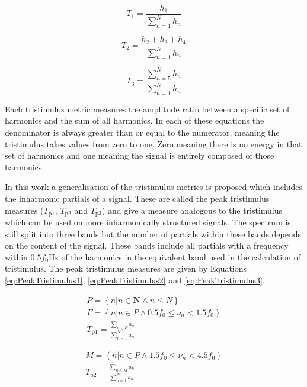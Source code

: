 			\begin{equation}
				T_{1} = \frac{h_{1}}{\sum_{n = 1}^{N} h_{n}}
				\label{eq:Tristimulus1}
			\end{equation}

			\begin{equation}
				T_{2} = \frac{h_{2} + h_{3} + h_{4}}{\sum_{n = 1}^{N} h_{n}}
				\label{eq:Tristimulus2}
			\end{equation}

			\begin{equation}
				T_{3} = \frac{\sum_{n = 5}^{N} h_{n}}{\sum_{n = 1}^{N} h_{n}}
				\label{eq:Tristimulus3}
			\end{equation}

			Each tristimulus metric measures the amplitude ratio between a specific set of harmonics and the
			sum of all harmonics. In each of these equations the denominator is always greater than or equal to
			the numerator, meaning the tristimulus takes values from zero to one. Zero meaning there is no
			energy in that set of harmonics and one meaning the signal is entirely composed of those harmonics.

			In this work a generalisation of the tristimulus metrics is proposed which includes the inharmonic
			partials of a signal. These are called the peak tristimulus measures ($T_{\mathrm{p}1}$,
			$T_{\mathrm{p}2}$ and $T_{\mathrm{p}3}$) and give a measure analogous to the tristimulus which can
			be used on more inharmonically structured signals. The spectrum is still split into three bands but
			the number of partials within these bands depends on the content of the signal. These bands include
			all partials with a frequency within $0.5f_{0}$Hz of the harmonics in the equivalent band used in
			the calculation of tristimulus.  The peak tristimulus measures are given by Equations
			\ref{eq:PeakTristimulus1}, \ref{eq:PeakTristimulus2} and \ref{eq:PeakTristimulus3}.

			\begin{gather}
				P = \left\{ n | n \in \textbf{N} \land n \leq N \right\} \nonumber \\[1em]
				F = \left\{ n | n \in P \land 0.5f_{0} \leq \nu_{n} < 1.5f_{0} \right\} \nonumber \\[0.6em]
				T_{\mathrm{p}1} = \frac{\sum_{n \in F} a_{n}}{\sum_{n = 1}^{N} a_{n}}
				\label{eq:PeakTristimulus1}
			\end{gather}

			\begin{gather}
				M = \left\{ n | n \in P \land 1.5f_{0} \leq \nu_{n} < 4.5f_{0} \right\} \nonumber \\[0.6em]
				T_{\mathrm{p}2} = \frac{\sum_{n \in M} a_{n}}{\sum_{n = 1}^{N} a_{n}}
				\label{eq:PeakTristimulus2}
			\end{gather}

